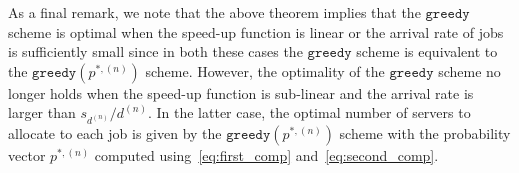 \documentclass[a4paper]{article}
\theoremstyle{plain}
\theoremstyle{definition}
\theoremstyle{case}
\theoremstyle{remark}
\begin{document}
As a final remark, we note that the above theorem implies that the $\texttt{greedy}$ scheme is optimal when the speed-up function is linear or the arrival rate of jobs is sufficiently small since in both these cases the $\texttt{greedy}$ scheme is equivalent to the $\texttt{greedy}(p^{*,(n)})$ scheme. However, the optimality of the $\texttt{greedy}$ scheme no longer holds when
the speed-up function is sub-linear and the arrival rate is larger than $s_{d^{(n)}}/d^{(n)}$. In the latter case, 
the optimal number of servers to allocate to each job is given by the $\texttt{greedy}(p^{*,(n)})$ scheme with the probability vector $p^{*,(n)}$ computed using~\eqref{eq:first_comp} and~\eqref{eq:second_comp}.
\end{document}
